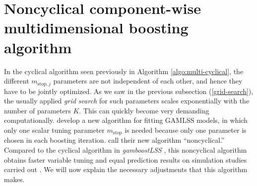 \section{Noncyclical component-wise multidimensional boosting algorithm}
In the cyclical algorithm seen previously in Algorithm \ref{algo:multi-cyclical}, the different $m_{\text{stop},j}$ parameters are not independent of each other, and hence they have to be jointly optimized.
As we saw in the previous subsection (\ref{grid-search}), the usually applied \textit{grid search} for such parameters scales exponentially with the number of parameters $K$.
This can quickly become very demanding computationally.
\citet{thomas2018} develop a new algorithm for fitting GAMLSS models, in which only one scalar tuning parameter $m_{\text{stop}}$ is needed because only one parameter is chosen in each boosting iteration.
\citet{thomas2018} call their new algorithm ``noncyclical.''
Compared to the cyclical algorithm in \textit{gamboostLSS} \citep{gamboostlss-paper}, this noncyclical algorithm obtains faster variable tuning and equal prediction results on simulation studies carried out \citep{thomas2018}.
We will now explain the necessary adjustments that this algorithm makes.

